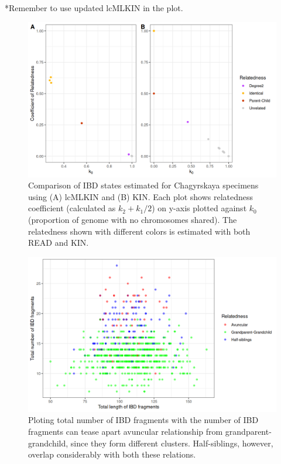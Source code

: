 \documentclass[12pt, letterpaper]{article}
\begin{document}
*Remember to use updated lcMLKIN in the plot.
\begin{figure}[h!]
    \centering
    \includegraphics[width=18cm]{supplementary_info/plots/lcPlot.png}
    \caption{Comparison of IBD states estimated for Chagyrskaya specimens using (A) lcMLKIN and (B) KIN. Each plot shows relatedness coefficient (calculated as $k_2+k_1/2$) on y-axis plotted against $k_0$ (proportion of genome with no chromosomes shared).
    The relatedness shown with different colors is estimated with both READ and KIN.}
    \label{figS6:Chagyrskaya_ibd}
\end{figure}


\begin{figure}[h!]
    \centering
    \includegraphics[width=18cm]{supplementary_info/plots/degree2_10Mwin.png}
    \caption{Ploting total number of IBD fragments with the number of IBD fragments can tease apart avuncular relationship from grandparent-grandchild, since they form different clusters. Half-siblings, however, overlap considerably with both these relations.}
    \label{figS7:second_degree}
\end{figure}
\end{document}
